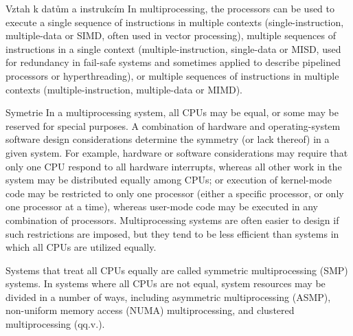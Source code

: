 \begin{obecne}{Vztah k datům a instrukcím}
In multiprocessing, the processors can be used to execute a single sequence of instructions in multiple contexts (single-instruction, multiple-data or SIMD, often used in vector processing), multiple sequences of instructions in a single context (multiple-instruction, single-data or MISD, used for redundancy in fail-safe systems and sometimes applied to describe pipelined processors or hyperthreading), or multiple sequences of instructions in multiple contexts (multiple-instruction, multiple-data or MIMD).
\end{obecne}

\begin{obecne}{Symetrie}
In a multiprocessing system, all CPUs may be equal, or some may be reserved for special purposes. A combination of hardware and operating-system software design considerations determine the symmetry (or lack thereof) in a given system. For example, hardware or software considerations may require that only one CPU respond to all hardware interrupts, whereas all other work in the system may be distributed equally among CPUs; or execution of kernel-mode code may be restricted to only one processor (either a specific processor, or only one processor at a time), whereas user-mode code may be executed in any combination of processors. Multiprocessing systems are often easier to design if such restrictions are imposed, but they tend to be less efficient than systems in which all CPUs are utilized equally.

Systems that treat all CPUs equally are called symmetric multiprocessing (SMP) systems. In systems where all CPUs are not equal, system resources may be divided in a number of ways, including asymmetric multiprocessing (ASMP), non-uniform memory access (NUMA) multiprocessing, and clustered multiprocessing (qq.v.).
\end{obecne}

